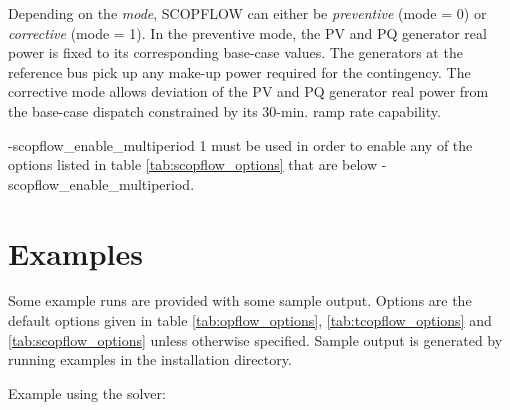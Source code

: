 Depending on the \emph{mode}, SCOPFLOW can either be \emph{preventive} (mode = 0) or \emph{corrective} (mode = 1). In the preventive mode, the PV and PQ generator real power is fixed to its corresponding base-case values. The generators at the reference bus pick up any make-up power required for the contingency. The corrective mode allows deviation of the PV and PQ generator real power from the base-case dispatch constrained by its 30-min. ramp rate capability.

-scopflow\_enable\_multiperiod 1 must be used in order to enable any of the options listed in table \ref{tab:scopflow_options} that are below -scopflow\_enable\_multiperiod.

\section{Examples}

Some \scopflow example runs are provided with some sample output. Options are the default options given in table \ref{tab:opflow_options}, \ref{tab:tcopflow_options} and \ref{tab:scopflow_options} unless otherwise specified. Sample output is generated by running examples in the installation directory.

Example using the \ipopt solver:

